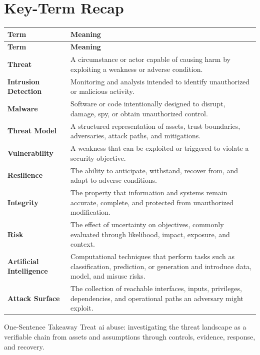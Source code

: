 \documentclass[11pt,letterpaper]{article}
\begin{document}
\section*{Key-Term Recap}
\begin{longtable}{>{\raggedright\arraybackslash}p{}>{\raggedright\arraybackslash}p{}}
\toprule\rowcolor{Navy}\color{white}\textbf{Term} & \color{white}\textbf{Meaning}\\\midrule
\endfirsthead
\toprule\rowcolor{Navy}\color{white}\textbf{Term} & \color{white}\textbf{Meaning}\\\midrule
\endhead
\textbf{Threat} & A circumstance or actor capable of causing harm by exploiting a weakness or adverse condition. \\\midrule
\textbf{Intrusion Detection} & Monitoring and analysis intended to identify unauthorized or malicious activity. \\\midrule
\textbf{Malware} & Software or code intentionally designed to disrupt, damage, spy, or obtain unauthorized control. \\\midrule
\textbf{Threat Model} & A structured representation of assets, trust boundaries, adversaries, attack paths, and mitigations. \\\midrule
\textbf{Vulnerability} & A weakness that can be exploited or triggered to violate a security objective. \\\midrule
\textbf{Resilience} & The ability to anticipate, withstand, recover from, and adapt to adverse conditions. \\\midrule
\textbf{Integrity} & The property that information and systems remain accurate, complete, and protected from unauthorized modification. \\\midrule
\textbf{Risk} & The effect of uncertainty on objectives, commonly evaluated through likelihood, impact, exposure, and context. \\\midrule
\textbf{Artificial Intelligence} & Computational techniques that perform tasks such as classification, prediction, or generation and introduce data, model, and misuse risks. \\\midrule
\textbf{Attack Surface} & The collection of reachable interfaces, inputs, privileges, dependencies, and operational paths an adversary might exploit. \\\midrule
\bottomrule
\end{longtable}
\begin{CornellExamBox}{One-Sentence Takeaway}
Treat ai abuse: investigating the threat landscape as a verifiable chain from assets and assumptions through controls, evidence, response, and recovery.
\end{CornellExamBox}
\end{document}
